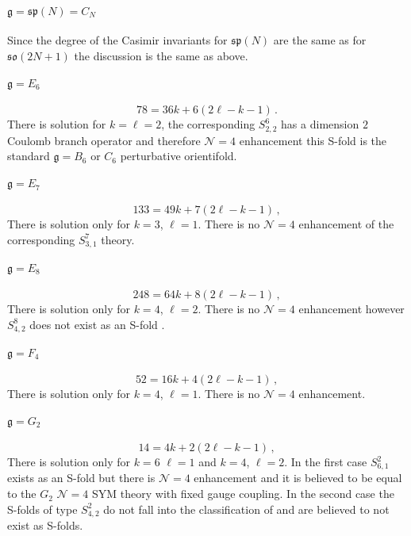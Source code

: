 \documentclass[main.tex]{subfiles}
\begin{document}
\paragraph{$\mathfrak{g}=\mathfrak{sp}(N)=C_N$}
Since the degree of the Casimir invariants for $\mathfrak{sp}(N)$ are the same as for $\mathfrak{so}(2N+1)$ the discussion is the same as above.
\paragraph{$\mathfrak{g}=E_6$}
\begin{equation}
78=36k+6(2\ell-k-1)\,.
\end{equation}
There is solution for $k=\ell=2$, the corresponding $S^6_{2,2}$ has a dimension $2$ Coulomb branch operator and therefore $\mathcal{N}=4$ enhancement this S-fold is the standard $\mathfrak{g}=B_6$ or $C_6$ perturbative orientifold.
\paragraph{$\mathfrak{g}=E_7$}
\begin{equation}
133=49k+7(2\ell-k-1)\,,
\end{equation}
There is solution only for $k=3$, $\ell=1$. There is no $\mathcal{N}=4$ enhancement of the corresponding $S_{3,1}^7$ theory.
\paragraph{$\mathfrak{g}=E_8$}
\begin{equation}
248=64k+8(2\ell-k-1)\,,
\end{equation}
There is solution only for $k=4$, $\ell=2$. There is no $\mathcal{N}=4$ enhancement however $S^8_{4,2}$ does not exist as an S-fold \cite{Aharony:2016kai}.
\paragraph{$\mathfrak{g}=F_4$}
\begin{equation}
52=16k+4(2\ell-k-1)\,,
\end{equation}
There is solution only for $k=4$, $\ell=1$. There is no $\mathcal{N}=4$ enhancement.
\paragraph{$\mathfrak{g}=G_2$}
\begin{equation}
14=4k+2(2\ell-k-1)\,,
\end{equation}
There is solution only for $k=6$ $\ell=1$ and $k=4$, $\ell=2$. In the first case $S^2_{6,1}$ exists as an S-fold but there is $\mathcal{N}=4$ enhancement and it is believed to be equal to the $G_2$ $\mathcal{N}=4$ SYM theory with fixed gauge coupling. In the second case the S-folds of type $S_{4,2}^2$ do not fall into the classification of \cite{Aharony:2016kai} and are believed to not exist as S-folds.
\end{document}

